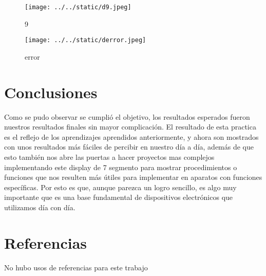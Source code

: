 \documentclass{article}
\begin{document}
\begin{multicols}{2}
\begin{figure}[H]
	\centering
	\texttt{[image: ../../static/d9.jpeg]}	
	\caption{9}
	\label{fig:12}
\end{figure}

\begin{figure}[H]
	\centering
	\texttt{[image: ../../static/derror.jpeg]}	
	\caption{error}
	\label{fig:13}
\end{figure}




\section{Conclusiones}\label{sec:conclusion}
Como se pudo observar se cumplió el objetivo, los resultados esperados fueron nuestros resultados finales sin mayor complicación. El resultado de esta practica es el reflejo de los aprendizajes aprendidos anteriormente, y ahora son mostrados con unos resultados más fáciles de percibir en nuestro día a día, además de que esto también nos abre las puertas a hacer proyectos mas complejos implementando este display de 7 segmento para mostrar procedimientos o funciones que nos resulten más útiles para implementar en aparatos con funciones específicas.  Por esto es que, aunque parezca un logro sencillo, es algo muy importante que es una base fundamental de dispositivos electrónicos que utilizamos día con día.
\section*{Referencias}\label{sec:referencias}	
No hubo usos de referencias para este trabajo
\end{multicols}
\end{document}

